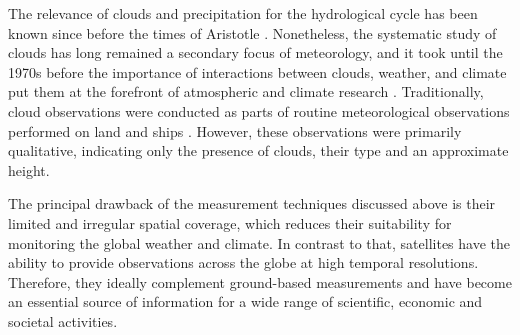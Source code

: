 The relevance of clouds and precipitation for the hydrological cycle has been
known since before the times of Aristotle \citep{frisinger72}. Nonetheless, the
systematic study of clouds has long remained a secondary focus of
meteorology, and it took until the 1970s before the importance of interactions
between clouds, weather, and climate put them at the forefront of atmospheric and
climate research \citep{stephens03}. Traditionally, cloud observations were
conducted as parts of routine meteorological observations performed on land and
ships \citep{hughes84}. However, these observations were primarily qualitative,
indicating only the presence of clouds, their type and an  approximate
height.

The principal drawback of the measurement techniques discussed above is their
limited and irregular spatial coverage, which reduces their suitability for
monitoring the global weather and climate. In contrast to that, satellites have
the ability to provide observations across the globe at high temporal
resolutions. Therefore, they ideally complement ground-based measurements
and have become an essential source of information for a wide range of
scientific, economic and societal activities.

